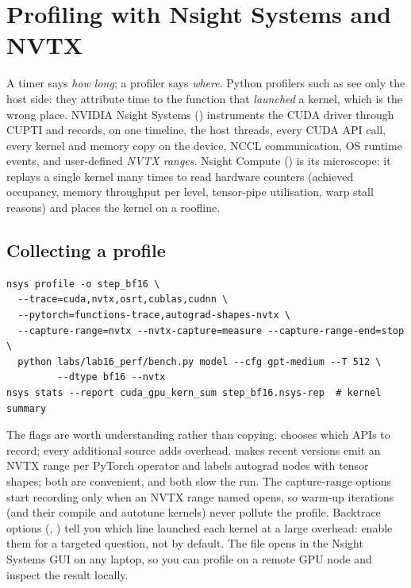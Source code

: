 \section{Profiling with Nsight Systems and NVTX}\label{sec:perf:nsys}

A timer says \emph{how long}; a profiler says \emph{where}. Python profilers such as
 see only the host side: they attribute time to the function that \emph{launched}
a kernel, which is the wrong place. NVIDIA Nsight Systems () instruments the CUDA
driver through CUPTI and records, on one timeline, the host threads, every CUDA API call, every
kernel and memory copy on the device, NCCL communication, OS runtime events, and user-defined
\emph{NVTX ranges}. Nsight Compute () is its microscope: it replays a single kernel many
times to read hardware counters (achieved occupancy, memory throughput per level, tensor-pipe
utilisation, warp stall reasons) and places the kernel on a roofline.

\subsection{Collecting a profile}

\begin{lstlisting}[style=shell,caption={Profiling only the measured iterations.},label={lst:perf:nsys}]
nsys profile -o step_bf16 \
  --trace=cuda,nvtx,osrt,cublas,cudnn \
  --pytorch=functions-trace,autograd-shapes-nvtx \
  --capture-range=nvtx --nvtx-capture=measure --capture-range-end=stop \
  python labs/lab16_perf/bench.py model --cfg gpt-medium --T 512 \
         --dtype bf16 --nvtx
nsys stats --report cuda_gpu_kern_sum step_bf16.nsys-rep  # kernel summary
\end{lstlisting}

The flags are worth understanding rather than copying.  chooses which APIs to
record; every additional source adds overhead.  makes recent
\code{nsys} versions emit an NVTX range per PyTorch operator and  labels
autograd nodes with tensor shapes; both are convenient, and both slow the run. The capture-range
options start recording only when an NVTX range named  opens, so warm-up iterations
(and their compile and autotune kernels) never pollute the profile. Backtrace options
(\code{--cudabacktrace}, \code{--python-backtrace}) tell you which line launched each kernel at a
large overhead: enable them for a targeted question, not by default. The \code{.nsys-rep} file
opens in the Nsight Systems GUI on any laptop, so you can profile on a remote GPU node and inspect
the result locally.

